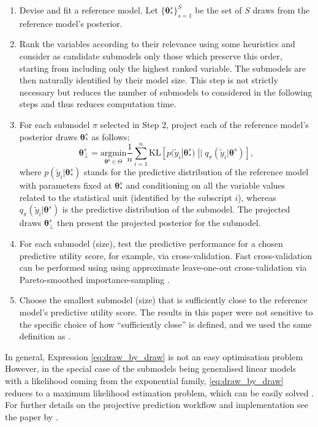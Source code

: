 \documentclass[a4]{article}
\theoremstyle{definition}
\begin{document}
\begin{enumerate}
\item Devise and fit a reference model. Let $\{\boldsymbol{\theta}_{*}^{s}\}_{s=1}^{S}$ be the set of $S$ draws from the reference model's posterior.
\item Rank the variables according to their relevance using some
  heuristics and consider as candidate submodels only those which
  preserve this order, starting from including only the highest ranked
  variable. The submodels are then naturally identified by their
  model size. This step is not strictly necessary but reduces the number
  of submodels to considered in the following steps and thus reduces computation time.
\item For each submodel $\pi$ selected in Step 2, project each of the reference model's posterior draws $\boldsymbol{\theta}_{*}^{s}$ as follows:
\begin{equation}\label{eq:draw_by_draw}
\boldsymbol{\theta}_{\perp}^{s} = \underset{\boldsymbol{\theta^{s}}\in\Theta}{\text{argmin}} \frac{1}{n}\sum_{i=1}^{n}\text{KL} \left[ p(\tilde{y}_{i}|\boldsymbol{\theta}_{*}^{s})\;||\;q_\pi(\tilde{y}_{i}|\boldsymbol{\theta}^{s}) \right],
\end{equation}
where $p(\tilde{y}_{i}|\boldsymbol{\theta}_{*}^{s})$ stands for the
predictive distribution of the reference model with parameters fixed
at $\boldsymbol{\theta}_{*}^{s}$ and conditioning on all the variable
values related to the statistical unit (identified by the subscript
$i$), whereas $q_\pi(\tilde{y}_{i}|\boldsymbol{\theta}^{s})$ is the
predictive distribution of the submodel. The projected draws
$\boldsymbol{\theta}_{\perp}^{s}$ then present the projected posterior
for the submodel.
\item For each submodel (size), test the predictive performance for a chosen predictive utility score, for example, via cross-validation. Fast cross-validation can be performed using using approximate leave-one-out cross-validation via Pareto-smoothed importance-sampling
\citep[PSIS-LOO-CV; ][]{paper:psis_loo}.
\item Choose the smallest submodel (size) that is sufficiently close to the reference model's predictive utility score. The results in this paper were not sensitive to the specific choice of how ``sufficiently close'' is defined, and we used the same definition as \citet{paper:projpred}.
\end{enumerate} 

In general, Expression \eqref{eq:draw_by_draw} is not an easy optimisation problem
However, in the special case of the submodels being
generalised linear models with a likelihood coming from the exponential family, \eqref{eq:draw_by_draw} reduces to a
maximum likelihood estimation problem, which can be easily solved
\citep{paper:original_proj}. For further details on the projective
prediction workflow and implementation see the paper by \citet{paper:projpred}.
\end{document}
